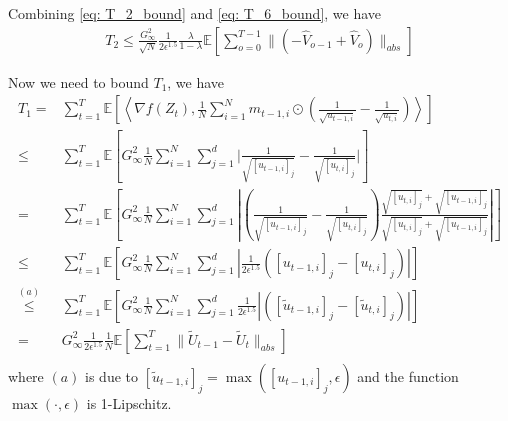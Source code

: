 \documentclass{article} %
\begin{document}
Combining \eqref{eq: T_2_bound} and \eqref{eq: T_6_bound}, we have
\begin{align}
T_2 \leq  \frac{G_{\infty}^2}{\sqrt{N}}\frac{1}{2\epsilon^{1.5}} \frac{\lambda}{1-\lambda}   \mathbb E \left[ \sum_{o=0}^{T-1}     \|    (- \hat V_{o-1} + \hat V_{o} ) \|_{abs} \right] 
\end{align}

Now we need to bound $T_1$, we have
\begin{align}\label{eq: T_1}
T_1 = & \sum_{t=1}^T   \mathbb E \left [\left \langle \nabla f( Z_{t}) , \frac{1}{N} \sum_{i=1}^N m_{t-1	,i} \odot (\frac{1}{\sqrt{u_{t-1,i}}} - \frac{1}{\sqrt{u_{t,i}}}) \right \rangle \right] \nonumber \\
\leq & \sum_{t=1}^T   \mathbb E \left [   G_{\infty}^2 \frac{1}{N} \sum_{i=1}^N \sum_{j=1}^d \bigg|\frac{1}{\sqrt{[u_{t-1,i}]_j}} - \frac{1}{\sqrt{[u_{t,i}]_j}}\bigg|   \right] \nonumber \\
= & \sum_{t=1}^T   \mathbb E \left [   G_{\infty}^2 \frac{1}{N} \sum_{i=1}^N \sum_{j=1}^d \left|\left(\frac{1}{\sqrt{[u_{t-1,i}]_j}} - \frac{1}{\sqrt{[u_{t,i}]_j}}\right) \frac{\sqrt{[u_{t,i}]_j}+\sqrt{[u_{t-1,i}]_j}}{\sqrt{[u_{t,i}]_j}+\sqrt{[u_{t-1,i}]_j}}\right|    \right] \nonumber \\
\leq & \sum_{t=1}^T   \mathbb E \left [   G_{\infty}^2 \frac{1}{N} \sum_{i=1}^N \sum_{j=1}^d \left|\frac{1}{2\epsilon^{1.5}}\left({{[u_{t-1,i}]_j}} - {{[u_{t,i}]_j}}\right) \right|    \right] \nonumber \\
\overset{(a)}{\leq} & \sum_{t=1}^T   \mathbb E \left [   G_{\infty}^2 \frac{1}{N} \sum_{i=1}^N \sum_{j=1}^d\frac{1}{2\epsilon^{1.5}} \left|\left({{[\tilde u_{t-1,i}]_j}} - {{[\tilde u_{t,i}]_j}}\right) \right|    \right] \nonumber \\
= &  G_{\infty}^2 \frac{1}{2\epsilon^{1.5}} \frac{1}{N}   \mathbb E \left [  \sum_{t=1}^T   \|{{\tilde U_{t-1}}} - {{\tilde U_{t}}\|_{abs}}    \right] \nonumber \\
\end{align}
where $(a)$ is due to $[\tilde u_{t-1,i}]_j = \max ([u_{t-1,i}]_j,\epsilon)$ and the function $\max(\cdot,\epsilon)$ is 1-Lipschitz.
\end{document}
